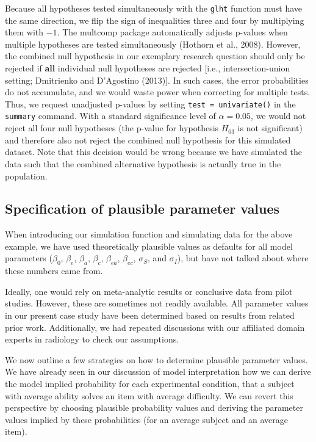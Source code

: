 \documentclass[
  man,floatsintext]{apa6}
\begin{document}
Because all hypotheses tested simultaneously with the \texttt{glht} function must have the same direction, we flip the sign of inequalities three and four by multiplying them with \(-1\). The multcomp package automatically adjusts p-values when multiple hypotheses are tested simultaneously (Hothorn et al., 2008). However, the combined null hypothesis in our exemplary research question should only be rejected if \textbf{all} individual null hypotheses are rejected {[}i.e., intersection-union setting; Dmitrienko and D'Agostino (2013){]}. In such cases, the error probabilities do not accumulate, and we would waste power when correcting for multiple tests. Thus, we request unadjusted p-values by setting \texttt{test\ =\ univariate()} in the \texttt{summary} command. With a standard significance level of \(\alpha = 0.05\), we would not reject all four null hypotheses (the p-value for hypothesis \(H_{03}\) is not significant) and therefore also not reject the combined null hypothesis for this simulated dataset. Note that this decision would be wrong because we have simulated the data such that the combined alternative hypothesis is actually true in the population.

\hypertarget{specification-of-plausible-parameter-values}{%
\subsection{Specification of plausible parameter values}\label{specification-of-plausible-parameter-values}}

When introducing our simulation function and simulating data for the above example, we have used theoretically plausible values as defaults for all model parameters (\(\beta_0\), \(\beta_e\), \(\beta_a\), \(\beta_c\), \(\beta_{ea}\), \(\beta_{ec}\), \(\sigma_S\), and \(\sigma_I\)), but have not talked about where these numbers came from.

Ideally, one would rely on meta-analytic results or conclusive data from pilot studies. However, these are sometimes not readily available. All parameter values in our present case study have been determined based on results from related prior work. Additionally, we had repeated discussions with our affiliated domain experts in radiology to check our assumptions.

We now outline a few strategies on how to determine plausible parameter values. We have already seen in our discussion of model interpretation how we can derive the model implied probability for each experimental condition, that a subject with average ability solves an item with average difficulty. We can revert this perspective by choosing plausible probability values and deriving the parameter values implied by these probabilities (for an average subject and an average item).
\end{document}
